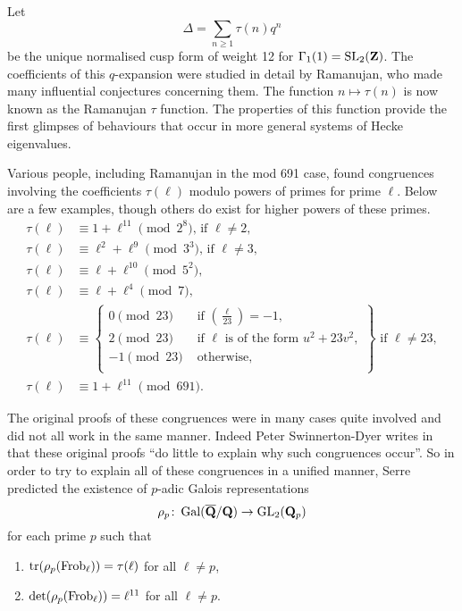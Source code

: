 \documentclass[a4paper,12pt]{article}
\begin{document}
\begin{ex}\label{ex:delt}
Let
\[
\Delta = \sum_{n \ge 1} \tau(n) q^n
\]
be the unique normalised cusp form of weight 12 for $\Gamma_1(1) = \operatorname{SL}_2(\mathbf{Z})$.
The coefficients of this $q$-expansion were studied in detail by Ramanujan, who made many influential conjectures concerning them.
The function $n \mapsto \tau(n)$ is now known as the Ramanujan $\tau$ function.
The properties of this function provide the first glimpses of behaviours that occur in more general systems of Hecke eigenvalues.

Various people, including Ramanujan in the mod 691 case, found congruences involving the coefficients $\tau(\ell)$ modulo powers of primes for prime $\ell$.
Below are a few examples, though others do exist for higher powers of these primes.
\begin{align}
\tau(\ell) &\equiv 1 + \ell^{11} \pmod{2^8}\text{, if } \ell \ne 2,\label{eq:tau2}\\
\tau(\ell) &\equiv \ell^2 + \ell^9 \pmod{3^3}\text{, if } \ell \ne 3,\label{eq:tau3}\\
\tau(\ell) &\equiv \ell + \ell^{10} \pmod{5^2},\label{eq:tau5}\\
\tau(\ell) &\equiv \ell + \ell^4 \pmod{7},\label{eq:tau7}\\
\tau(\ell) &\equiv\left.\begin{cases}
0\pmod{23} & \text{ if } \left(\frac{\ell}{23}\right) = -1,\\
2\pmod{23} & \text{ if }\ell\text{ is of the form } u^2 + 23v^2,\\
-1\pmod{23} & \text{ otherwise},\\
\end{cases}\right\}\text{ if } \ell \ne 23,\label{eq:tau23}\\
\tau(\ell) &\equiv 1 + \ell^{11} \pmod{691}.\label{eq:tau691}
\end{align}

The original proofs of these congruences were in many cases quite involved and did not all work in the same manner.
Indeed Peter Swinnerton-Dyer writes in \cite{SD} that these original proofs ``do little to explain why such congruences occur''.
So in order to try to explain all of these congruences in a unified manner, Serre predicted \cite{Serre67} the existence of $p$-adic Galois representations
\[
\rho_p\colon \operatorname{Gal}(\overline{\mathbf{Q}}/\mathbf{Q}) \to \operatorname{GL}_2(\mathbf{Q}_p)
\]
for each prime $p$ such that
\begin{enumerate}
\item $\operatorname{tr}(\rho_p (\operatorname{Frob}_\ell)) = \tau(\ell)$ for all $\ell \ne p$,\label{item:trace}
\item $\det(\rho_p (\operatorname{Frob}_\ell)) = \ell^{11}$ for all $\ell \ne p$.\label{item:det}
\end{enumerate}


\end{ex}
\end{document}
